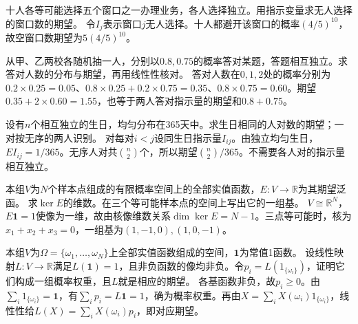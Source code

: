 十人各等可能选择五个窗口之一办理业务，各人选择独立。用指示变量求无人选择的窗口数的期望。
\solutionanswer
令\(I_j\)表示窗口\(j\)无人选择。十人都避开该窗口的概率\((4/5)^{10}\)，故空窗口数期望为\(5(4/5)^{10}\)。


从甲、乙两校各随机抽一人，分别以\(0.8,0.75\)的概率答对某题，答题相互独立。求答对人数的分布与期望，再用线性性核对。
\solutionanswer
答对人数在\(0,1,2\)处的概率分别为\(0.2\times0.25=0.05\)、\(0.8\times0.25+0.2\times0.75=0.35\)、\(0.8\times0.75=0.60\)。期望\(0.35+2\times0.60=1.55\)，也等于两人答对指示量的期望和\(0.8+0.75\)。


设有\(n\)个相互独立的生日，均匀分布在365天中。求生日相同的人对数的期望；一对按无序的两人识别。
\solutionanswer
对每对\(i<j\)设同生日指示量\(I_{ij}\)。由独立均匀生日，\(EI_{ij}=1/365\)。无序人对共\(\binom n2\)个，所以期望\(\binom n2/365\)。不需要各人对的指示量相互独立。


本组\(V\)为\(N\)个样本点组成的有限概率空间上的全部实值函数，\(E:V\to\mathbb R\)为其期望泛函。
求\(\ker E\)的维数。在三个等可能样本点的空间上写出它的一组基。
\solutionanswer
\(V\cong\mathbb R^N\)，\(E\mathbf1=1\)使像为一维，故由核像维数关系\(\dim\ker E=N-1\)。三点等可能时，核为\(x_1+x_2+x_3=0\)，一组基为\((1,-1,0),(1,0,-1)\)。


本组\(V\)为\(\Omega=\{\omega_1,\ldots,\omega_N\}\)上全部实值函数组成的空间，\(\mathbf1\)为常值1函数。
设线性映射\(L:V\to\mathbb R\)满足\(L(\mathbf1)=1\)，且非负函数的像均非负。令\(p_i=L(1_{\{\omega_i\}})\)，证明它们构成一组概率权重，且\(L\)就是相应的期望。
\solutionanswer
各基函数非负，故\(p_i\ge0\)。由\(\sum_i1_{\{\omega_i\}}=\mathbf1\)，有\(\sum_ip_i=L\mathbf1=1\)，确为概率权重。再由\(X=\sum_iX(\omega_i)1_{\{\omega_i\}}\)，线性性给\(L(X)=\sum_iX(\omega_i)p_i\)，即对应期望。
\par
